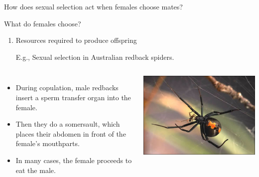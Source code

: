 \begin{frame}[t]
    \begin{adjustwidth}{-2em}{-1.5em}
        \vspace{-3mm}
        How does sexual selection act when females choose mates?

        \vspace{2mm}
        What do females choose?

        \begin{enumerate}
            \addtocounter{enumi}{1}
            \item Resources required to produce offspring

                \vspace{1mm}
            E.g., Sexual selection in Australian redback spiders.
        \end{enumerate}

        \begin{columns}[t]


        \vspace{-5mm}
        \begin{itemize}
                \small
            \item During copulation, male redbacks insert a sperm transfer
                organ into the female.

            \item Then they do a somersault, which places their abdomen in
                front of the female's mouthparts.

            \item In many cases, the female proceeds to eat the male.
        \end{itemize}

        
        \includegraphics[width=\columnwidth]{spider.jpg}

        \end{columns}

    \end{adjustwidth}
\end{frame}

